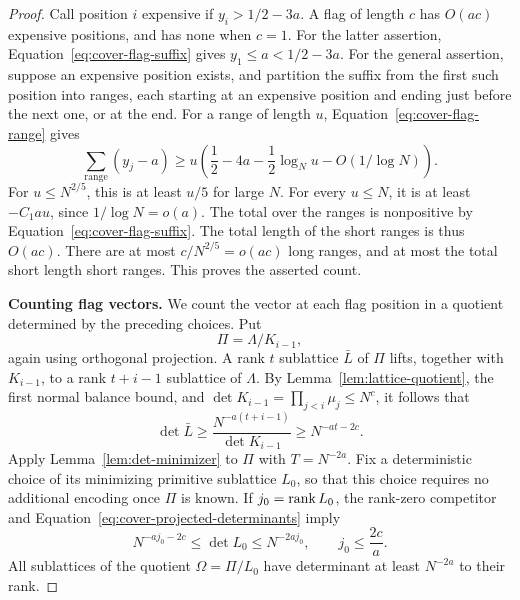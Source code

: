 \begin{proof}
Call position \(i\) expensive if \(y_i>1/2-3a\). A flag of length
\(c\) has \(O(ac)\) expensive positions, and has none when \(c=1\).
For the latter assertion, Equation~\eqref{eq:cover-flag-suffix} gives
\(y_1\le a<1/2-3a\). For the general assertion, suppose an expensive
position exists, and partition the suffix from the first such position
into ranges, each starting at an expensive position and ending just
before the next one, or at the end. For a range of length \(u\),
Equation~\eqref{eq:cover-flag-range} gives
\[
 \sum_{\text{range}}(y_j-a)
 \ge u\left(\frac12-4a-\frac12\log_Nu-O(1/\log N)\right).
\]
For \(u\le N^{2/5}\), this is at least \(u/5\) for large \(N\).
For every \(u\le N\), it is at least \(-C_1au\), since
\(1/\log N=o(a)\). The total over the ranges is nonpositive by
Equation~\eqref{eq:cover-flag-suffix}. The total length of the short
ranges is thus \(O(ac)\). There are at most \(c/N^{2/5}=o(ac)\) long
ranges, and at most the total short length short ranges. This proves
the asserted count.

\medskip\noindent\textbf{Counting flag vectors.}
We count the vector at each flag position in a quotient determined by
the preceding choices. Put
\[
 \Pi=\Lambda/K_{i-1},
\]
again using orthogonal projection. A rank \(t\) sublattice \(\bar L\)
of \(\Pi\) lifts, together with \(K_{i-1}\), to a rank \(t+i-1\)
sublattice of \(\Lambda\). By Lemma~\ref{lem:lattice-quotient}, the
first normal balance bound, and
\(\det K_{i-1}=\prod_{j<i}\mu_j\le N^c\), it follows that
\begin{equation}\label{eq:cover-projected-determinants}
 \det\bar L\ge
 \frac{N^{-a(t+i-1)}}{\det K_{i-1}}
 \ge N^{-at-2c}.
\end{equation}
Apply Lemma~\ref{lem:det-minimizer} to \(\Pi\) with \(T=N^{-2a}\).
Fix a deterministic choice of its minimizing primitive sublattice
\(L_0\), so that this choice requires no additional encoding once
\(\Pi\) is known. If \(j_0=\operatorname{rank} L_0\), the rank-zero competitor and
Equation~\eqref{eq:cover-projected-determinants} imply
\[
 N^{-aj_0-2c}\le\det L_0\le N^{-2aj_0},
 \qquad j_0\le \frac{2c}{a}.
\]
All sublattices of the quotient \(\Omega=\Pi/L_0\) have determinant
at least \(N^{-2a}\) to their rank.


\end{proof}
